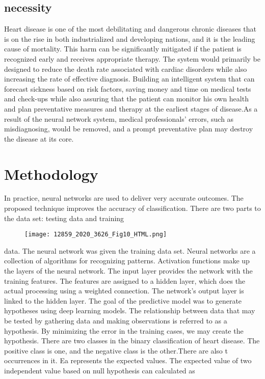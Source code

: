 \documentclass[12pt]{article}
\begin{document}
\subsection{necessity}
Heart disease is one of the most debilitating and dangerous chronic diseases that is on the rise in both industrialized and developing nations, and it is the leading cause of mortality. This harm can be significantly mitigated if the patient is recognized early and receives appropriate therapy. The system would primarily be designed to reduce the death rate associated with cardiac disorders while also increasing the rate of effective diagnosis. Building an intelligent system that can forecast sickness based on risk factors, saving money and time on medical tests and check-ups while also assuring that the patient can monitor his own health and plan preventative measures and therapy at the earliest stages of disease.As a result of the neural network system, medical professionals' errors, such as misdiagnosing, would be removed, and a prompt preventative plan may destroy the disease at its core.

\section{Methodology}
In practice, neural networks are used to deliver very accurate outcomes. The proposed technique improves the accuracy of classification. There are two parts to the data set: testing data and training 

\begin{figure}[h]
    \centering
    \texttt{[image: 12859\_2020\_3626\_Fig10\_HTML.png]}
\end{figure}


data. The neural network was given the training data set. Neural networks are a collection of algorithms for recognizing patterns. Activation functions make up the layers of the neural network. The input layer provides the network with the training features. The features are assigned to a hidden layer, which does the actual processing using a weighted connection. The network's output layer is linked to the hidden layer. The goal of the predictive model was to generate hypotheses using deep learning models. The relationship between data that may be tested by gathering data and making observations is referred to as a hypothesis. By minimizing the error in the training cases, we may create the hypothesis. 
There are two classes in the binary classification of heart disease. The positive class is one, and the negative class is the other.There are also t occurrences in it. 
Ea represents the expected values. The expected value of two independent value based on null hypothesis can calculated as
 
\end{document}
